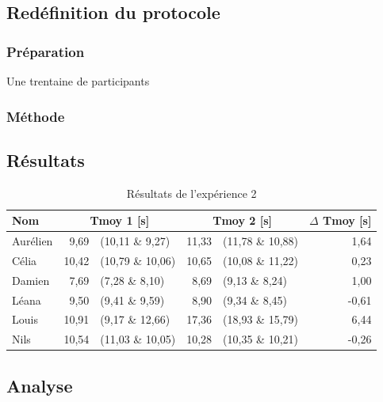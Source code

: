 \documentclass[12pt,fleqn,oneside,openany]{book} %
\begin{document}
\subsection{Redéfinition du protocole} \label{ssec:defProto2.2}

\subsubsection{Préparation} \label{sssec:preparation2.2}
\begin{description}
	\item[Une trentaine de participants]
\end{description}

\subsubsection{Méthode} \label{sssec:methode2.2}

\subsection{Résultats} \label{ssec:resultats2.2}

\begin{table}[h]
	\centering
	\caption{Résultats de l'expérience 2} \label{tbl:exp2.2}
	\begin{tabular}{lrlrlr}
		\toprule
		\textbf{Nom} &  \multicolumn{2}{c}{\textbf{Tmoy 1 [s]}}  & \multicolumn{2}{c}{\textbf{Tmoy 2 [s]}} & \textbf{$\Delta$ Tmoy [s]} \\ \midrule
		Aurélien & 9,69 & (10,11 \& 9,27) & 11,33 & (11,78 \& 10,88) & 1,64 \\
		Célia & 10,42 & (10,79 \& 10,06) & 10,65 & (10,08 \& 11,22) & 0,23 \\
		Damien & 7,69 & (7,28 \& 8,10) & 8,69 & (9,13 \& 8,24) & 1,00 \\
		Léana & 9,50 & (9,41 \& 9,59) & 8,90 & (9,34 \& 8,45) & -0,61 \\
		Louis & 10,91 & (9,17 \& 12,66) & 17,36 & (18,93 \& 15,79) & 6,44 \\
		Nils & 10,54 & (11,03 \& 10,05) & 10,28 & (10,35 \& 10,21) & -0,26 \\ \bottomrule
	\end{tabular}
\end{table}

\subsection{Analyse} \label{ssec:analyse2.2}
\end{document}
